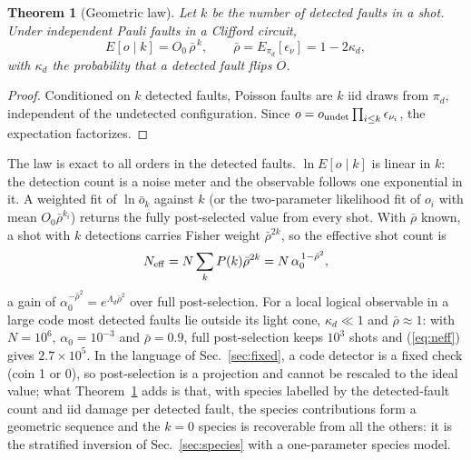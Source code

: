 \documentclass[11pt,a4paper]{article}
\newtheorem{theorem}{Theorem}
\theoremstyle{remark}
\begin{document}
\begin{theorem}[Geometric law]
\label{thm:geometric}
Let $k$ be the number of detected faults in a shot. Under independent Pauli faults in a Clifford circuit,
\begin{equation}
E[o\mid k]=O_0\,\bar\rho^{\,k},\qquad\bar\rho=E_{\pi_d}[\epsilon_\nu]=1-2\kappa_d,
\label{eq:geometric}
\end{equation}
with $\kappa_d$ the probability that a detected fault flips $O$.
\end{theorem}
\begin{proof}
Conditioned on $k$ detected faults, Poisson faults are $k$ iid draws from $\pi_d$, independent of the undetected configuration. Since $o=o_{\rm undet}\prod_{i\le k}\epsilon_{\nu_i}$, the expectation factorizes.
\end{proof}

The law is exact to all orders in the detected faults. $\ln E[o\mid k]$ is linear in $k$: the detection count is a noise meter and the observable follows one exponential in it. A weighted fit of $\ln\bar o_k$ against $k$ (or the two-parameter likelihood fit of $o_i$ with mean $O_0\bar\rho^{k_i}$) returns the fully post-selected value from every shot. With $\bar\rho$ known, a shot with $k$ detections carries Fisher weight $\bar\rho^{2k}$, so the effective shot count is
\begin{equation}
N_{\rm eff}=N\sum_kP(k)\bar\rho^{2k}=N\,\alpha_0^{\,1-\bar\rho^2},
\label{eq:neff}
\end{equation}
a gain of $\alpha_0^{-\bar\rho^2}=e^{\Lambda_d\bar\rho^2}$ over full post-selection. For a local logical observable in a large code most detected faults lie outside its light cone, $\kappa_d\ll1$ and $\bar\rho\approx1$: with $N=10^6$, $\alpha_0=10^{-3}$ and $\bar\rho=0.9$, full post-selection keeps $10^3$ shots and (\ref{eq:neff}) gives $2.7\times10^5$. In the language of Sec.~\ref{sec:fixed}, a code detector is a fixed check (coin 1 or 0), so post-selection is a projection and cannot be rescaled to the ideal value; what Theorem~\ref{thm:geometric} adds is that, with species labelled by the detected-fault count and iid damage per detected fault, the species contributions form a geometric sequence and the $k=0$ species is recoverable from all the others: it is the stratified inversion of Sec.~\ref{sec:species} with a one-parameter species model.
\end{document}
